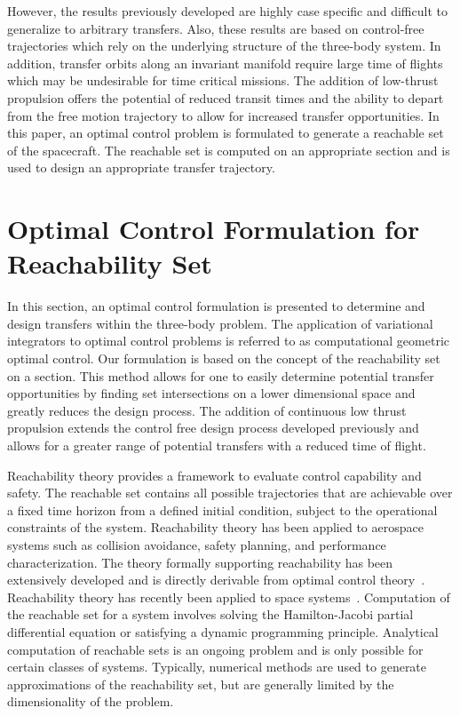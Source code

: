 \documentclass[preprint]{elsarticle}
\begin{document}
However, the results previously developed are highly case specific and difficult to generalize to arbitrary transfers.
Also, these results are based on control-free trajectories which rely on the underlying structure of the three-body system.
In addition, transfer orbits along an invariant manifold require large time of flights which may be undesirable for time critical missions.
The addition of low-thrust propulsion offers the potential of reduced transit times and the ability to depart from the free motion trajectory to allow for increased transfer opportunities. 
In this paper, an optimal control problem is formulated to generate a reachable set of the spacecraft.
The reachable set is computed on an appropriate \Poincare section and is used to design an appropriate transfer trajectory.

\section{Optimal Control Formulation for Reachability Set}\label{sec:optimal_control}
In this section, an optimal control formulation is presented to determine and design transfers within the three-body problem.
The application of variational integrators to optimal control problems is referred to as computational geometric optimal control.
Our formulation is based on the concept of the reachability set on a \Poincare section.
This method allows for one to easily determine potential transfer opportunities by finding set intersections on a lower dimensional space and greatly reduces the design process.
The addition of continuous low thrust propulsion extends the control free design process developed previously and allows for a greater range of potential transfers with a reduced time of flight.

Reachability theory provides a framework to evaluate control capability and safety.  
The reachable set contains all possible trajectories that are achievable over a fixed time horizon from a defined initial condition, subject to the operational constraints of the system.
Reachability theory has been applied to aerospace systems such as collision avoidance, safety planning, and performance characterization.
The theory formally supporting reachability has been extensively developed and is directly derivable from optimal control theory~\cite{varaiya2000,lygeros2002,lygeros2004}.
Reachability theory has recently been applied to space systems~\cite{holzinger2009,komendera2012a}.
Computation of the reachable set for a system involves solving the Hamilton-Jacobi partial differential equation or satisfying a dynamic programming principle.
Analytical computation of reachable sets is an ongoing problem and is only possible for certain classes of systems.
Typically, numerical methods are used to generate approximations of the reachability set, but are generally limited by the dimensionality of the problem.
 
\end{document}
